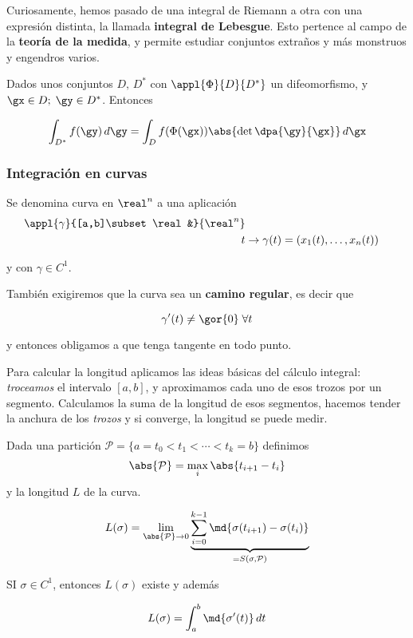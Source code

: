 Curiosamente, hemos pasado de una integral de Riemann a otra con una expresión distinta, la llamada \textbf{integral de Lebesgue}. Esto pertence al campo de la \textbf{teoría de la medida}, y permite estudiar conjuntos extraños y más monstruos y engendros varios.

\begin{theorem}
Dados unos conjuntos $D,\,D^\ast$ con $\appl{\Phi}{D}{D^\ast}$ un difeomorfismo, y $\gx \in D;\; \gy \in D^\ast$. Entonces

\[ \int_{D^\ast} f(\gy)\,d\gy = \int_D f(\Phi(\gx)) \abs{\det \dpa{\gy}{\gx}}\,d\gx \]
\end{theorem}

\subsubsection{Integración en curvas}

\begin{defn}[Curva\IS $C^1$]  Se denomina curva en $\real^n$ a una aplicación \begin{align*}
\appl{\gamma}{[a,b]\subset \real&}{\real^n} \\
t&\to \gamma(t) = (x_1(t),\dotsc,x_n(t))
\end{align*}

y con $\gamma\in C^1$.

También exigiremos que la curva sea un \textbf{camino regular}, es decir que

\[ \gamma'(t) \neq \gor{0} \;\forall t \]

y entonces obligamos a que tenga tangente en todo punto.
\end{defn}

Para calcular la longitud aplicamos las ideas básicas del cálculo integral: \textit{troceamos} el intervalo $[a,b]$, y aproximamos cada uno de esos trozos por un segmento. Calculamos la suma de la longitud de esos segmentos, hacemos tender la anchura de los \textit{trozos} y si converge, la longitud se puede medir.

\begin{theorem} Dada una partición $\mathcal{P} = \{ a= t_0 < t_1 < \dotsb < t_k = b\}$ definimos \[ \abs{\mathcal{P}} = \max_i \abs{t_{i+1} - t_i} \] y la longitud $L$ de la curva.

\[ L(\sigma) = \lim_{\abs{\mathcal{P}}\to 0} \underbrace{\sum_{i=0}^{k-1} \md{\sigma(t_{i+1}) - \sigma(t_i)}}_{=S(\sigma,\mathcal{P})} \]

SI $\sigma\in C^1$, entonces $L(\sigma)$ existe y además

\[ L(\sigma) = \int_a^b \md{\sigma'(t)}\,dt \]
\end{theorem}

